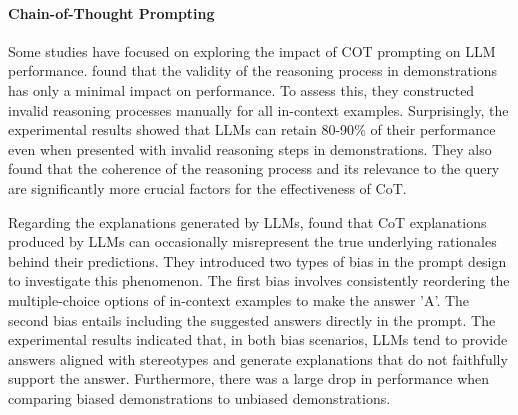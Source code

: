\paragraph{Chain-of-Thought Prompting}
Some studies have focused on exploring the impact of COT prompting on LLM performance.
\citet{Wang2022TowardsUC} found that the validity of the reasoning process in demonstrations has only a minimal impact on performance. 
To assess this, they constructed invalid reasoning processes manually for all in-context examples. Surprisingly, the experimental results showed that LLMs can retain 80-90$\%$ of their performance even when presented with invalid reasoning steps in demonstrations.
They also found that the coherence of the reasoning process and its relevance to the query are significantly more crucial factors for the effectiveness of CoT.

Regarding the explanations generated by LLMs, \citet{Turpin2023LanguageMD} found that CoT explanations produced by LLMs can occasionally misrepresent the true underlying rationales behind their predictions.
They introduced two types of bias in the prompt design to investigate this phenomenon.
The first bias involves consistently reordering the multiple-choice options of in-context examples to make the answer 'A'.
The second bias entails including the suggested answers directly in the prompt.
The experimental results indicated that, in both bias scenarios, LLMs tend to provide answers aligned with stereotypes and generate explanations that do not faithfully support the answer.
Furthermore, there was a large drop in performance when comparing biased demonstrations to unbiased demonstrations.

